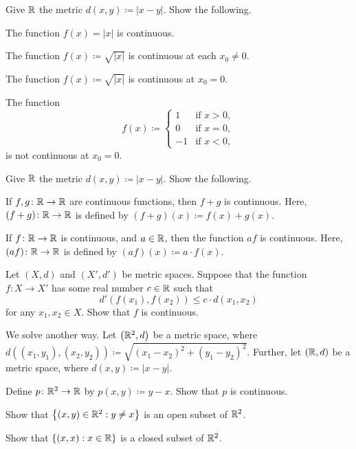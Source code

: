 \documentclass[../main.tex]{subfiles}
\begin{document}
\begin{homework}
    Give $\mathbb R$ the metric $d(x,y)\coloneqq|x-y|$. Show the following.
    \begin{listalph}
        \item The function $f(x)=|x|$ is continuous.
        \item The function $f(x)\coloneqq\sqrt{|x|}$ is continuous at each $x_0\ne0$.
        \item The function $f(x)\coloneqq\sqrt{|x|}$ is continuous at $x_0=0$.
        \item The function
        \[f(x)\coloneqq\begin{cases}
            1 & \text{if }x>0, \\
            0 & \text{if }x=0, \\
            -1 & \text{if }x<0,
        \end{cases}\]
        is not continuous at $x_0=0$.
    \end{listalph}
\end{homework}
\begin{homework}
    Give $\mathbb R$ the metric $d(x,y)\coloneqq|x-y|$. Show the following.
    \begin{listalph}
        \item If $f,g\colon\mathbb R\to\mathbb R$ are continuous functions, then $f+g$ is continuous. Here, $(f+g)\colon\mathbb R\to\mathbb R$ is defined by $(f+g)(x)\coloneqq f(x)+g(x)$.
        \item If $f\colon\mathbb R\to\mathbb R$ is continuous, and $a\in\mathbb R$, then the function $af$ is continuous. Here, $(af)\colon\mathbb R\to\mathbb R$ is defined by $(af)(x)\coloneqq a\cdot f(x)$.
    \end{listalph}
\end{homework}
\begin{homework}
    Let $(X,d)$ and $(X',d')$ be metric spaces. Suppose that the function $f\colon X\to X'$ has some real number $c\in\mathbb R$ such that
    \[d'(f(x_1),f(x_2))\le c\cdot d(x_1,x_2)\]
    for any $x_1,x_2\in X$. Show that $f$ is continuous.
\end{homework}
\begin{homework}
    We solve  another way. Let $\left(\mathbb R^2,d\right)$ be a metric space, where $d((x_1,y_1),(x_2,y_2))\coloneqq\sqrt{(x_1-x_2)^2+(y_1-y_2)^2}$. Further, let $(\mathbb R,d)$ be a metric space, where $d(x,y)\coloneqq|x-y|$.
    \begin{listalph}
        \item Define $p\colon\mathbb R^2\to\mathbb R$ by $p(x,y)\coloneqq y-x$. Show that $p$ is continuous.
        \item Show that $\left\{(x,y)\in\mathbb R^2:y\ne x\right\}$ is an open subset of $\mathbb R^2$.
        \item Show that $\{(x,x):x\in\mathbb R\}$ is a closed subset of $\mathbb R^2$.
    \end{listalph}
\end{homework}
\end{document}
